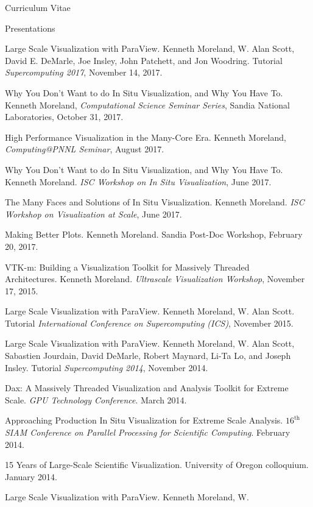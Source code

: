 \documentclass{article}
\begin{document}
\begin{cv}{Curriculum Vitae}
\begin{cvlist}{Presentations}
    \item[Large Scale Visualization with ParaView.]
      Kenneth Moreland, W. Alan Scott, David E. DeMarle, Joe Insley, John Patchett, and Jon Woodring.
      Tutorial \emph{Supercomputing 2017}, November 14, 2017.
    \item[Why You Don't Want to do In Situ Visualization, and Why You Have To.]
      Kenneth Moreland, \emph{Computational Science Seminar Series}, Sandia National Laboratories, October 31, 2017.
    \item[High Performance Visualization in the Many-Core Era.]
      Kenneth Moreland, \emph{Computing@PNNL Seminar}, August 2017.
    \item[Why You Don't Want to do In Situ Visualization, and Why You Have To.]
      Kenneth Moreland.
      \emph{ISC Workshop on In Situ Visualization}, June 2017.
    \item[The Many Faces and Solutions of In Situ Visualization.]
      Kenneth Moreland.
      \emph{ISC Workshop on Visualization at Scale}, June 2017.
    \item[Making Better Plots.]
      Kenneth Moreland.
      Sandia Post-Doc Workshop, February 20, 2017.
    \item[VTK-m: Building a Visualization Toolkit for Massively Threaded]~\\ Architectures.
      Kenneth Moreland.
      \emph{Ultrascale Visualization Workshop}, November 17, 2015.
    \item[Large Scale Visualization with ParaView.] Kenneth Moreland, W.
      Alan Scott. Tutorial \emph{International Conference on Supercomputing
        (ICS)}, November 2015.
    \item[Large Scale Visualization with ParaView.] Kenneth Moreland, W.
      Alan Scott, Sabastien Jourdain, David DeMarle, Robert Maynard, Li-Ta
      Lo, and Joseph Insley. Tutorial \emph{Supercomputing 2014}, November
      2014.
    \item[Dax: A Massively Threaded Visualization and Analysis Toolkit for
      Extreme] Scale. \emph{GPU Technology Conference}. March 2014.
    \item[Approaching Production In Situ Visualization for Extreme Scale
      Analysis.] \emph{$16^{\mathrm{th}}$ SIAM Conference on Parallel
      Processing for Scientific Computing}. February 2014.
    \item[15 Years of Large-Scale Scientific Visualization.] University of
      Oregon colloquium. January 2014.
    \item[Large Scale Visualization with ParaView.] Kenneth Moreland, W.

\end{cvlist}
\end{cv}
\end{document}
